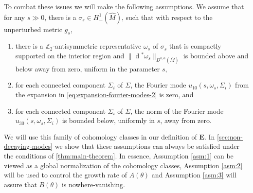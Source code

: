 \documentclass[preprint,12pt]{elsarticle}
\numberwithin{table}{section}
\newcommand{\Z}{\mathbb{Z}}
\renewcommand{\d}{\operatorname{d}\!}
\begin{document}
To combat these issues we will make the following assumptions. We assume that for any $s \gg 0$, there is a $\sigma_s \in H^1_-(\hat{M})$, such that with respect to the unperturbed metric $g_s$,
\begin{enumerate}[label=\textbf{A\arabic*},ref=A\arabic*]
	\item \label{asm:1} there is a $\Z_2$-antisymmetric representative $\omega_s$ of $\sigma_s$ that is compactly supported on the interior region and $\| \d^* \omega_s \|_{D^{k, \alpha}(\overline{M})}$ is bounded above and below away from zero, uniform in the parameter $s$,
	\item \label{asm:2} for each connected component $\Sigma_i$ of $\Sigma$, the Fourier mode $u_{10}(s, \omega_s, \Sigma_i)$ from the expansion in \cref{eq:expansion-fourier-modes-2} is zero, and 
	\item \label{asm:3} for each connected component $\Sigma_i$ of $\Sigma$, the norm of the Fourier mode $u_{30}(s, \omega_s, \Sigma_i)$ is bounded below, uniformly in $s$, away from zero.
\end{enumerate}
We will use this family of cohomology classes in our definition of $\mathbf{E}$.
In \cref{sec:non-decaying-modes} we show that these assumptions can always be satisfied under the conditions of \cref{thm:main-theorem}. In essence, Assumption \ref{asm:1} can be viewed as a global normalization of the cohomology classes, Assumption \ref{asm:2} will be used to control the growth rate of $A(\theta)$ and Assumption \ref{asm:3} will assure that $B(\theta)$ is nowhere-vanishing.
\end{document}
